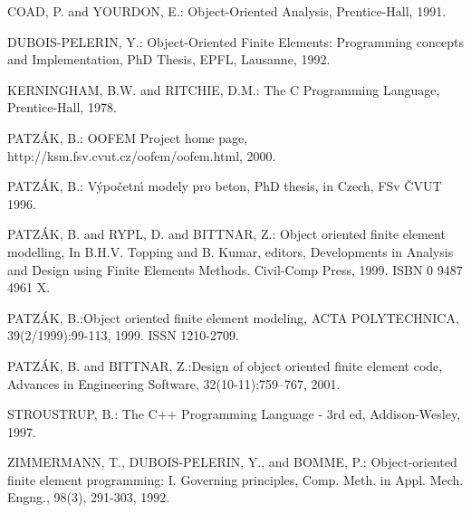 \documentclass[12pt,draft]{article}
\begin{document}
{}
\begin{thebibliography}{9}

COAD, P. and YOURDON, E.: {Object-Oriented Analysis,} Prentice-Hall,  1991.

DUBOIS-PELERIN, Y.: {Object-Oriented  Finite Elements:
Programming concepts and Implementation,} PhD Thesis, EPFL, Lausanne, 1992.

 KERNINGHAM, B.W. and RITCHIE, D.M.: {The C Programming
Language,} Prentice-Hall, 1978.

 PATZ\'{A}K, B.: {OOFEM Project home page,}
http://ksm.fsv.cvut.cz/oofem/oofem.html, 2000.

 PATZ\'{A}K, B.: {V\'{y}po\v{c}etn\'{\i} modely pro beton,} PhD
thesis, in Czech, FSv \v{C}VUT 1996. 

 PATZ\'{A}K, B. and RYPL, D. and BITTNAR, Z.: {Object
oriented finite element modelling,} In B.H.V. Topping and B. Kumar, editors,
Developments in Analysis and Design using Finite Elements
Methods. Civil-Comp Press, 1999. ISBN 0 9487 4961 X. 

 PATZ\'{A}K, B.:{Object oriented finite element modeling,} ACTA POLYTECHNICA, 39(2/1999):99-113, 1999. ISSN
1210-2709. 

 PATZ\'{A}K, B. and BITTNAR, Z.:{Design of object
oriented finite element code}, Advances in Engineering Software,
32(10-11):759--767, 2001. 

 STROUSTRUP, B.: {The C++ Programming Language - 3rd ed,}
Addison-Wesley, 1997.

 ZIMMERMANN, T., DUBOIS-PELERIN, Y., and BOMME, P.: {Object-oriented finite element programming: I. Governing principles,} Comp. Meth. in Appl. Mech. Engng., 98(3), 291-303, 1992. 
\end{thebibliography}
\end{document}
